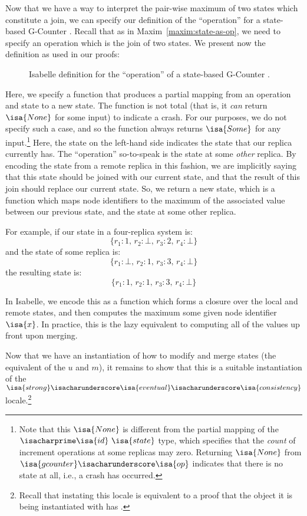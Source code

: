 Now that we have a way to interpret the pair-wise maximum of two states which
constitute a join, we can specify our definition of the ``operation'' for a
state-based G-Counter \CRDT. Recall that as in Maxim~\ref{maxim:state-as-op}, we
need to specify an operation which is the join of two states. We present now the
definition as used in our proofs:

\begin{figure}[H]
  
  \caption{Isabelle definition for the ``operation'' of a state-based G-Counter
    \CRDT.}
\end{figure}

Here, we specify a function that produces a partial mapping from an operation
and state to a new state. The function is not total (that is, it \emph{can}
return $\isa{None}$ for some input) to indicate a crash. For our purposes, we do
not specify such a case, and so the function always returns $\isa{Some}$ for any
input.\footnote{Note that this $\isa{None}$ is different from the partial
mapping of the $\isacharprime\isa{id}~\isa{state}$ type, which specifies that
the \emph{count} of increment operations at some replicas may zero. Returning
$\isa{None}$ from $\isa{gcounter}\isacharunderscore\isa{op}$ indicates that
there is no state at all, i.e., a crash has occurred.} Here, the state on the
left-hand side indicates the state that our replica currently has. The
``operation'' so-to-speak is the state at some \emph{other} replica. By encoding
the state from a remote replica in this fashion, we are implicitly saying that
this state should be joined with our current state, and that the result of this
join should replace our current state. So, we return a new state, which is a
function which maps node identifiers to the maximum of the associated value
between our previous state, and the state at some other replica.

For example, if our state in a four-replica system is:
\[
  \{ r_1 : 1,\, r_2 : \bot,\, r_3 : 2,\, r_4 : \bot \}
\]
and the state of some replica is:
\[
  \{ r_1 : \bot,\, r_2 : 1,\, r_3 : 3,\, r_4 : \bot \}
\]
the resulting state is:
\[
  \{ r_1 : 1,\, r_2 : 1,\, r_3 : 3,\, r_4 : \bot \}
\]

In Isabelle, we encode this as a function which forms a closure over the local
and remote states, and then computes the maximum some given node identifier
$\isa{x}$. In practice, this is the lazy equivalent to computing all of the
values up front upon merging.

Now that we have an instantiation of how to modify and merge states (the
equivalent of the $u$ and $m$), it remains to show that this is a suitable
instantiation of the
$\isa{strong}\isacharunderscore\isa{eventual}\isacharunderscore\isa{consistency}$
locale.\footnote{Recall that instating this locale is equivalent to a proof that
the object it is being instantiated with has \SEC.}

